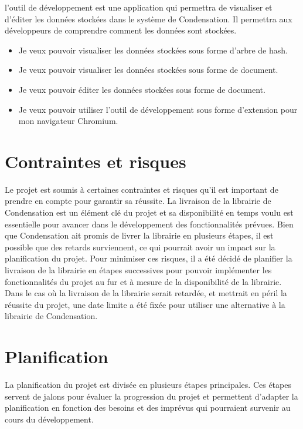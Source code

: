 l'outil de développement est une application qui permettra de visualiser et d'éditer les données stockées dans le système de Condensation. 
Il permettra aux développeurs de comprendre comment les données sont stockées.
\begin{itemize}
    \item  Je veux pouvoir visualiser les données stockées sous forme d'arbre de hash.
    \item  Je veux pouvoir visualiser les données stockées sous forme de document.
    \item  Je veux pouvoir éditer les données stockées sous forme de document.
    \item  Je veux pouvoir utiliser l'outil de développement sous forme d'extension pour mon navigateur Chromium.
\end{itemize}
\newpage
\section*{Contraintes et risques}
Le projet est soumis à certaines contraintes et risques qu'il est important de prendre en compte pour garantir sa réussite.
La livraison de la librairie de Condensation est un élément clé du projet et sa disponibilité en temps voulu est essentielle pour avancer dans le développement des fonctionnalités prévues. 
Bien que Condensation ait promis de livrer la librairie en plusieurs étapes, il est possible que des retards surviennent, ce qui pourrait avoir un impact sur la planification du projet.
Pour minimiser ces risques, il a été décidé de planifier la livraison de la librairie en étapes successives pour pouvoir implémenter les fonctionnalités du projet au fur et à mesure de la disponibilité de la librairie.
Dans le cas où la livraison de la librairie serait retardée, et mettrait en péril la réussite du projet, une date limite a été fixée pour utiliser une alternative à la librairie de Condensation.

\section*{Planification}
La planification du projet est divisée en plusieurs étapes principales. Ces étapes servent de jalons pour évaluer la progression du projet et permettent d'adapter la planification en fonction des besoins et des imprévus qui pourraient survenir au cours du développement.

